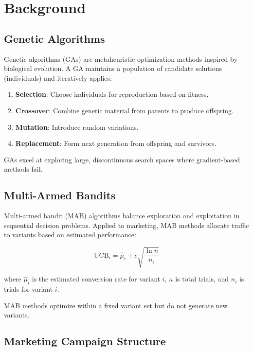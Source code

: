 \section{Background}


\subsection{Genetic Algorithms}

Genetic algorithms (GAs) \cite{holland1975} are metaheuristic optimization methods inspired by biological evolution. A GA maintains a population of candidate solutions (individuals) and iteratively applies:

\begin{enumerate}
\item \textbf{Selection}: Choose individuals for reproduction based on fitness.
\item \textbf{Crossover}: Combine genetic material from parents to produce offspring.
\item \textbf{Mutation}: Introduce random variations.
\item \textbf{Replacement}: Form next generation from offspring and survivors.
\end{enumerate}

GAs excel at exploring large, discontinuous search spaces where gradient-based methods fail.

\subsection{Multi-Armed Bandits}

Multi-armed bandit (MAB) algorithms \cite{thompson1933} balance exploration and exploitation in sequential decision problems. Applied to marketing, MAB methods allocate traffic to variants based on estimated performance:

\begin{equation}
\text{UCB}_i = \hat{\mu}_i + c\sqrt{\frac{\ln n}{n_i}}
\end{equation}

where $\hat{\mu}_i$ is the estimated conversion rate for variant $i$, $n$ is total trials, and $n_i$ is trials for variant $i$.

MAB methods optimize within a fixed variant set but do not generate new variants.

\subsection{Marketing Campaign Structure}

